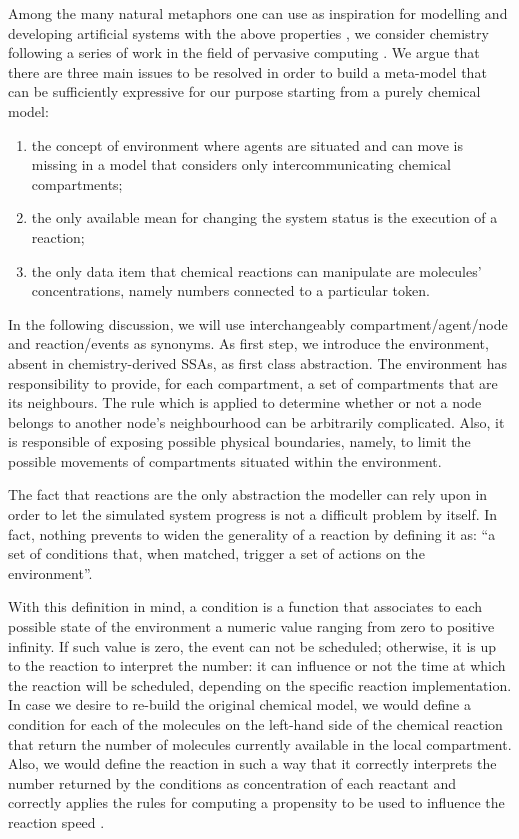 \documentclass[12pt,a4paper,twoside,openright]{book}
\begin{document}
Among the many natural metaphors one can use as inspiration for modelling and developing artificial systems with the above properties \cite{ecosystems-jpcc7}, we consider chemistry following a series of work in the field of pervasive computing \cite{VCMZ-TAAS2011,VZ-INS2010,sapere-procedia7}. 
%
We argue that there are three main issues to be resolved in order to build a meta-model that can be sufficiently expressive for our purpose starting from a purely chemical model:
\begin{enumerate}
 \item the concept of environment where agents are situated and can move is missing in a model that considers only intercommunicating chemical compartments;
 \item the only available mean for changing the system status is the execution of a reaction;
 \item the only data item that chemical reactions can manipulate are molecules' concentrations, namely numbers connected to a particular token.
\end{enumerate}

In the following discussion, we will use interchangeably compartment/agent/node and reaction/events as synonyms.
%
As first step, we introduce the environment, absent in chemistry-derived SSAs, as first class abstraction.
%
The environment has responsibility to provide, for each compartment, a set of compartments that are its neighbours.
%
The rule which is applied to determine whether or not a node belongs to another node's neighbourhood  can be arbitrarily complicated.
%
Also, it is responsible of exposing possible physical boundaries, namely, to limit the possible movements of compartments situated within the environment.

The fact that reactions are the only abstraction the modeller can rely upon in order to let the simulated system progress is not a difficult problem by itself.
%
In fact, nothing prevents to widen the generality of a reaction by defining it as: ``a set of conditions that, when matched, trigger a set of actions on the environment''.

With this definition in mind, a condition is a function that associates to each possible state of the environment a numeric value ranging from zero to positive infinity.
%
If such value is zero, the event can not be scheduled; otherwise, it is up to the reaction to interpret the number: it can influence or not the time at which the reaction will be scheduled, depending on the specific reaction implementation.
%
In case we desire to re-build the original chemical model, we would define a condition for each of the molecules on the left-hand side of the chemical reaction that return the number of molecules currently available in the local compartment.
%
Also, we would define the reaction in such a way that it correctly interprets the number returned by the conditions as concentration of each reactant and correctly applies the rules for computing a propensity to be used to influence the reaction speed \cite{gillespie1977}.
\end{document}
